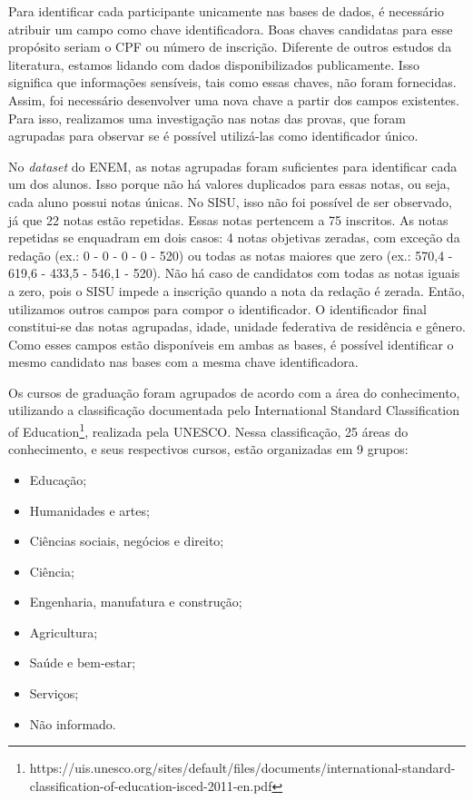 Para identificar cada participante unicamente nas bases de dados, é necessário atribuir um campo como chave identificadora. Boas chaves candidatas para esse propósito seriam o CPF ou número de inscrição. Diferente de outros estudos da literatura, estamos lidando com dados disponibilizados publicamente. Isso significa que informações sensíveis, tais como essas chaves, não foram fornecidas. Assim, foi necessário desenvolver uma nova chave a partir dos campos existentes. 
Para isso, realizamos uma investigação nas notas das provas, que foram agrupadas 
para observar se é possível utilizá-las como identificador único. 

No \textit{dataset} do ENEM, as notas agrupadas foram suficientes para identificar cada um dos alunos. Isso porque não há valores duplicados para essas notas, ou seja, cada aluno possui notas únicas. No SISU, isso não foi possível de ser observado, já que 22 notas estão repetidas. Essas notas pertencem a 75 inscritos. As notas repetidas se enquadram em dois casos: 4 notas objetivas zeradas, com exceção da redação (ex.: 0 - 0 - 0 - 0 - 520) ou todas as notas maiores que zero (ex.: 570,4 - 619,6 - 433,5 - 546,1 - 520). Não há caso de candidatos com todas as notas iguais a zero, pois o SISU impede a inscrição quando a nota da redação é zerada. Então, utilizamos outros campos para compor o identificador. O identificador final constitui-se das notas agrupadas, idade, unidade federativa de residência e gênero. Como esses campos estão disponíveis em ambas as bases, é possível identificar o mesmo candidato nas bases com a mesma chave identificadora.

Os cursos de graduação foram agrupados de acordo com a área do conhecimento, utilizando a classificação documentada pelo International Standard Classification of Education\footnote{https://uis.unesco.org/sites/default/files/documents/international-standard-classification-of-education-isced-2011-en.pdf}, realizada pela UNESCO. Nessa classificação, 25 áreas do conhecimento, e seus respectivos cursos, estão organizadas em 9 grupos: 

\begin{itemize}
  \item Educação;
  \item Humanidades e artes;
  \item Ciências sociais, negócios e direito;
  \item Ciência;
  \item Engenharia, manufatura e construção;
  \item Agricultura;
  \item Saúde e bem-estar;
  \item Serviços;
  \item Não informado.
\end{itemize}

